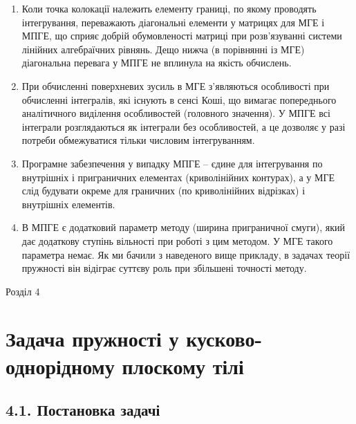 \begin{enumerate}
\def\labelenumi{\arabic{enumi}.}
\item
  Коли точка колокації належить елементу границі, по якому проводять
  інтегрування, переважають діагональні елементи у матрицях для МГЕ і
  МПГЕ, що сприяє добрій обумовленості матриці при розв'язуванні системи
  лінійних алгебраїчних рівнянь. Дещо нижча (в порівнянні із МГЕ)
  діагональна перевага у МПГЕ не вплинула на якість обчислень.
\item
  При обчисленні поверхневих зусиль в МГЕ з'являються особливості при
  обчисленні інтегралів, які існують в сенсі Коші, що вимагає
  попереднього аналітичного виділення особливостей (головного значення).
  У МПГЕ всі інтеграли розглядаються як інтеграли без особливостей, а це
  дозволяє у разі потреби обмежуватися тільки числовим інтегруванням.
\item
  Програмне забезпечення у випадку МПГЕ -- єдине для інтегрування по
  внутрішніх і приграничних елементах (криволінійних контурах), а у МГЕ
  слід будувати окреме для граничних (по криволінійних відрізках) і
  внутрішніх елементів.
\item
  В МПГЕ є додатковий параметр методу (ширина приграничної смуги), який
  дає додаткову ступінь вільності при роботі з цим методом. У МГЕ такого
  параметра немає. Як ми бачили з наведеного вище прикладу, в задачах
  теорії пружності він відіграє суттєву роль при збільшені точності
  методу.
\end{enumerate}

Розділ 4

\hypertarget{ux437ux430ux434ux430ux447ux430-ux43fux440ux443ux436ux43dux43eux441ux442ux456-ux443-ux43aux443ux441ux43aux43eux432ux43e-ux43eux434ux43dux43eux440ux456ux434ux43dux43eux43cux443-ux43fux43bux43eux441ux43aux43eux43cux443-ux442ux456ux43bux456}{%
\section{Задача пружності у кусково-однорідному плоскому
тілі}\label{ux437ux430ux434ux430ux447ux430-ux43fux440ux443ux436ux43dux43eux441ux442ux456-ux443-ux43aux443ux441ux43aux43eux432ux43e-ux43eux434ux43dux43eux440ux456ux434ux43dux43eux43cux443-ux43fux43bux43eux441ux43aux43eux43cux443-ux442ux456ux43bux456}}

\hypertarget{ux43fux43eux441ux442ux430ux43dux43eux432ux43aux430-ux437ux430ux434ux430ux447ux456-2}{%
\subsection{4.1. Постановка
задачі}\label{ux43fux43eux441ux442ux430ux43dux43eux432ux43aux430-ux437ux430ux434ux430ux447ux456-2}}

